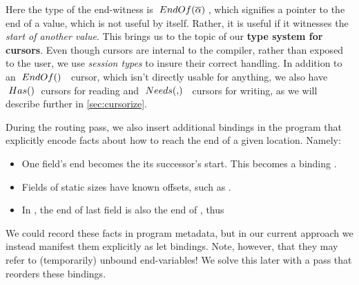 \documentclass[a4paper,english]{lipics-v2016}
\newcommand{\fresh}[1]{\ensuremath{#1}}
\newcommand{\freshA}{\fresh{\alpha}}
\newcommand{\locend}[1]{\ensuremath{\overline{#1}}}
\begin{document}

Here the type of the end-witness is $\ENDOF{\locend{\freshA}}$, which signifies
a pointer to the end of a value, which is not useful by itself.  Rather, it is
useful if it witnesses the {\em start of another value}.
%
This brings us to the topic of our {\bf type system for cursors}.  Even though
cursors are internal to the compiler, rather than exposed to the user, we use 
{\em session types} to insure their correct handling.  In addition to an
$\ENDOF$ cursor, which isn't directly usable for anything, we also have
$\; Has() \;$ cursors for reading and $\NEEDS{}$ cursors for writing, as we will
describe further in \cref{sec:cursorize}.

During the routing pass, we also insert additional bindings in the program that
explicitly encode facts about how to reach the end of a given location.  Namely:

\begin{itemize}
\item One field's end becomes the its successor's start.  This becomes a
  binding .
\item Fields of static sizes have known offsets, such as .  
\item In , the end of last field  is
  also the end of , thus \\ 
\end{itemize}

We could record these facts in program metadata, but in our current approach we
instead manifest them explicitly as let bindings.  Note, however, that they may
refer to (temporarily) unbound end-variables!  We solve this later with a pass
that reorders these bindings.
%
%
%
\end{document}

